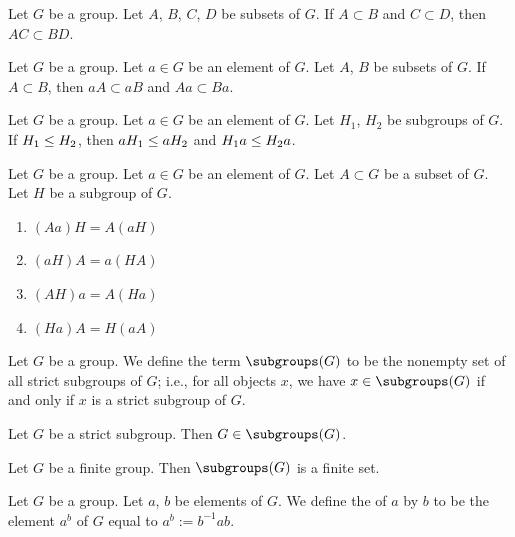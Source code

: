 \begin{theorem}
Let $G$ be a group. Let $A$, $B$, $C$, $D$ be subsets of $G$.
If $A\subset B$ and $C\subset D$, then $AC\subset BD$.
\end{theorem}

\begin{theorem}
Let $G$ be a group. Let $a\in G$ be an element of $G$.
Let $A$, $B$ be subsets of $G$. 
If $A\subset B$, then $aA\subset aB$ and $Aa\subset Ba$.
\end{theorem}

\begin{theorem}
Let $G$ be a group. Let $a\in G$ be an element of $G$.
Let $H_{1}$, $H_{2}$ be subgroups of $G$. 
If $H_{1}\leq H_{2}$, then $aH_{1}\leq aH_{2}$ and $H_{1}a\leq H_{2}a$.
\end{theorem}

\begin{theorem}
Let $G$ be a group. Let $a\in G$ be an element of $G$.
Let $A\subset G$ be a subset of $G$. Let $H$ be a subgroup of $G$.
\begin{enumerate}
\item{} $(Aa)H=A(aH)$
\item{} $(aH)A=a(HA)$
\item{} $(AH)a=A(Ha)$
\item{} $(Ha)A=H(aA)$
\end{enumerate}
\end{theorem}

\begin{definition}
Let $G$ be a group. We define the term $\subgroups(G)$ to be the nonempty set of
all strict subgroups of $G$; i.e., for all objects $x$, we have
$x\in\subgroups(G)$ if and only if $x$ is a strict subgroup of $G$.
\end{definition}

\begin{theorem}
Let $G$ be a strict subgroup. Then $G\in\subgroups(G)$.
\end{theorem}

\begin{theorem}
Let $G$ be a finite group. Then $\subgroups(G)$ is a finite set.
\end{theorem}

\begin{definition}
Let $G$ be a group.
Let $a$, $b$ be elements of $G$.
We define the  of $a$ by $b$ to be the element
$a^{b}$ of $G$ equal to $a^{b} := b^{-1}ab$.
\end{definition}

